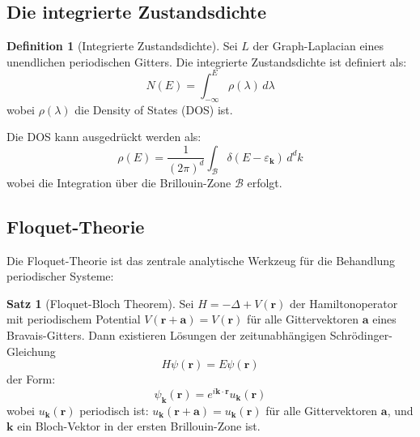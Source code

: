 \documentclass[a4paper,12pt]{article}
\theoremstyle{definition}
\newtheorem{definition}{Definition}[section]
\newtheorem{satz}{Satz}[section]
\begin{document}
\subsection{Die integrierte Zustandsdichte}

\begin{definition}[Integrierte Zustandsdichte]
	Sei $L$ der Graph-Laplacian eines unendlichen periodischen Gitters. Die integrierte Zustandsdichte ist definiert als:
	\[
	N(E) = \int_{-\infty}^{E} \rho(\lambda) \, d\lambda
	\]
	wobei $\rho(\lambda)$ die Density of States (DOS) ist.
	
	Die DOS kann ausgedrückt werden als:
	\[
	\rho(E) = \frac{1}{(2\pi)^d} \int_{\mathcal{B}} \delta(E - \varepsilon_{\mathbf{k}}) \, d^d k
	\]
	wobei die Integration über die Brillouin-Zone $\mathcal{B}$ erfolgt.
\end{definition}

\subsection{Floquet-Theorie}

Die Floquet-Theorie ist das zentrale analytische Werkzeug für die Behandlung periodischer Systeme:

\begin{satz}[Floquet-Bloch Theorem]\label{satz:floquet_bloch}
	Sei $H = -\Delta + V(\mathbf{r})$ der Hamiltonoperator mit periodischem Potential $V(\mathbf{r} + \mathbf{a}) = V(\mathbf{r})$ für alle Gittervektoren $\mathbf{a}$ eines Bravais-Gitters. Dann existieren Lösungen der zeitunabhängigen Schrödinger-Gleichung
	\[
	H \psi(\mathbf{r}) = E \psi(\mathbf{r})
	\]
	der Form:
	\[
	\psi_{\mathbf{k}}(\mathbf{r}) = e^{i \mathbf{k} \cdot \mathbf{r}} u_{\mathbf{k}}(\mathbf{r})
	\]
	wobei $u_{\mathbf{k}}(\mathbf{r})$ periodisch ist: $u_{\mathbf{k}}(\mathbf{r} + \mathbf{a}) = u_{\mathbf{k}}(\mathbf{r})$ für alle Gittervektoren $\mathbf{a}$, und $\mathbf{k}$ ein Bloch-Vektor in der ersten Brillouin-Zone ist.
\end{satz}
\end{document}
